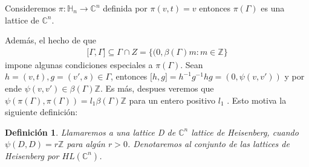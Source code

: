 \documentclass[12pt]{article}
\newtheorem{definition}{Definición}
\begin{document}
Consideremos $\pi :\mathbb{H}_{n}\rightarrow \mathbb{C}^{n}$  definida por $\pi (v,t)=v$
entonces $\pi(\Gamma)$ es una lattice de $\mathbb{C}^n$.

Además, el hecho de que
$$\begin{aligned}
{[} \Gamma,\Gamma {]} \subseteq \Gamma \cap Z = \{(0,\beta(\Gamma) m : m \in \mathbb{Z}\}
\end{aligned}$$
impone algunas condiciones especiales a $\pi(\Gamma)$.
Sean $h=(v,t),g=(v',s) \in \Gamma$, entonces ${[}h,g{]}=h^{-1}g^{-1}hg=(0,\psi(v,v'))$ 
y por ende $\psi(v,v') \in  \beta(\Gamma) \mathbb{Z}$.
Es más, despues veremos que $\psi(\pi(\Gamma),\pi(\Gamma))=l_1 \beta(\Gamma) \mathbb{Z}$ para un entero positivo $l_1$ .
Esto motiva la siguiente definición:

\begin{definition}
 Llamaremos a una lattice D de $\mathbb{C}^n$ lattice de Heisenberg, cuando $\psi(D,D)=r \mathbb{Z} $ para algún $r > 0$.
 Denotaremos al conjunto de las lattices de Heisenberg  por $HL(\mathbb{C}^n)$.
\end{definition}
\end{document}
